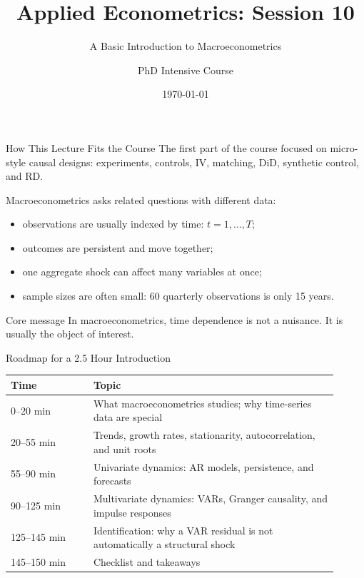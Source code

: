 \documentclass[11pt,aspectratio=169]{beamer}
\title{Applied Econometrics: Session 10}
\subtitle{A Basic Introduction to Macroeconometrics}
\author{PhD Intensive Course}
\institute{Lecture 10}
\date{\today}
\begin{document}
\begin{frame}
  \titlepage
\end{frame}

\begin{frame}{How This Lecture Fits the Course}
  The first part of the course focused on micro-style causal designs: experiments, controls, IV, matching, DiD, synthetic control, and RD.
  \vspace{0.5em}

  Macroeconometrics asks related questions with different data:
  \begin{itemize}
    \item observations are usually indexed by time: \(t=1,\ldots,T\);
    \item outcomes are persistent and move together;
    \item one aggregate shock can affect many variables at once;
    \item sample sizes are often small: 60 quarterly observations is only 15 years.
  \end{itemize}

  \begin{block}{Core message}
    In macroeconometrics, time dependence is not a nuisance. It is usually the object of interest.
  \end{block}
\end{frame}

\begin{frame}{Roadmap for a 2.5 Hour Introduction}
  \begin{tabular}{p{0.23\linewidth}p{0.68\linewidth}}
    \toprule
    Time & Topic \\
    \midrule
    0--20 min & What macroeconometrics studies; why time-series data are special \\
    20--55 min & Trends, growth rates, stationarity, autocorrelation, and unit roots \\
    55--90 min & Univariate dynamics: AR models, persistence, and forecasts \\
    90--125 min & Multivariate dynamics: VARs, Granger causality, and impulse responses \\
    125--145 min & Identification: why a VAR residual is not automatically a structural shock \\
    145--150 min & Checklist and takeaways \\
    \bottomrule
  \end{tabular}
\end{frame}
\end{document}
